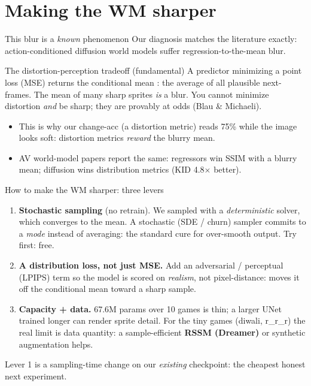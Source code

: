 \documentclass[aspectratio=169,11pt]{beamer}
\begin{document}
\section{Making the WM sharper}
\begin{frame}{This blur is a \emph{known} phenomenon}
  Our diagnosis matches the literature exactly: action-conditioned diffusion world
  models suffer \alert{regression-to-the-mean} blur.
  \vspace{0.4em}
  \begin{block}{The distortion-perception tradeoff (fundamental)}
    A predictor minimizing a point loss (MSE) returns the \alert{conditional mean}
   : the average of all plausible next-frames. The mean of many sharp sprites
    \emph{is} a blur. You cannot minimize distortion \emph{and} be sharp; they are
    provably at odds (Blau \& Michaeli).
  \end{block}
  \vspace{0.3em}
  \begin{itemize}\small
    \item This is why our \alert{change-acc (a distortion metric) reads 75\% while
          the image looks soft}: distortion metrics \emph{reward} the blurry mean.
    \item AV world-model papers report the same: regressors win SSIM with a blurry
          mean; diffusion wins distribution metrics (KID 4.8$\times$ better).
  \end{itemize}
\end{frame}

\begin{frame}{How to make the WM sharper: three levers}
  \small
  \begin{enumerate}
    \item \textbf{Stochastic sampling} (no retrain). We sampled with a
          \emph{deterministic} solver, which converges to the mean. A
          \alert{stochastic (SDE / churn) sampler} commits to a \emph{mode} instead
          of averaging: the standard cure for over-smooth output. Try first: free.
    \item \textbf{A distribution loss, not just MSE.} Add an adversarial /
          perceptual (LPIPS) term so the model is scored on \emph{realism}, not
          pixel-distance: moves it off the conditional mean toward a sharp sample.
    \item \textbf{Capacity + data.} 67.6M params over 10 games is thin; a larger
          UNet trained longer can render sprite detail. For the tiny games
          (diwali, r\_r\_r) the real limit is \alert{data quantity}: a
          sample-efficient \textbf{RSSM (Dreamer)} or synthetic augmentation helps.
  \end{enumerate}
  \vspace{0.3em}
  {\scriptsize Lever 1 is a sampling-time change on our \emph{existing}
  checkpoint: the cheapest honest next experiment.}
\end{frame}
\end{document}
